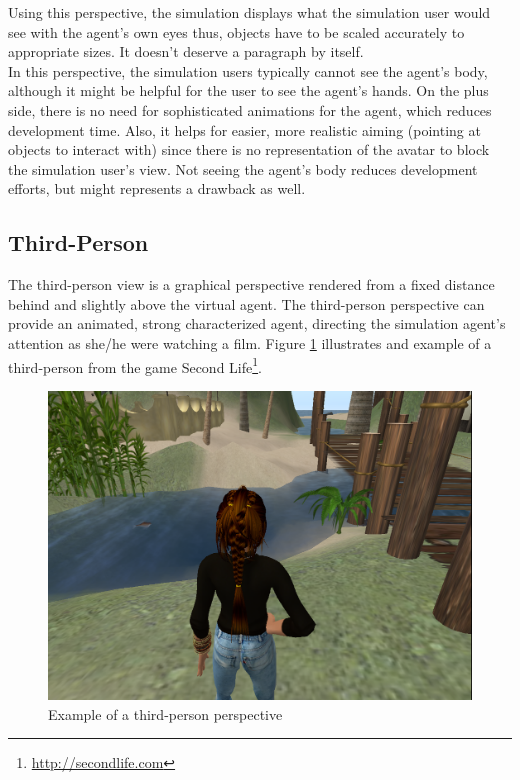 Using this perspective, the simulation displays what the simulation user would see with the agent's own eyes thus, objects have to be scaled accurately to appropriate sizes. It doesn't deserve a paragraph by itself.\\

In this perspective, the simulation users typically cannot see the agent's body, although it might be helpful for the user to see the agent's hands. On the plus side, there is no need for sophisticated animations for the agent, which reduces development time. Also, it helps for easier, more realistic aiming (pointing at objects to interact with) since there is no representation of the avatar to block the simulation user's view. Not seeing the agent's body reduces development efforts, but might represents a drawback as well.\\

\subsection{Third-Person}\label{subsec:third_person}
The third-person view is a graphical perspective rendered from a fixed distance behind and slightly above the virtual agent. The third-person perspective can provide an animated, strong characterized agent, directing the simulation agent's attention as she/he were watching a film. Figure \ref{fig:req_third_person} illustrates and example of a third-person from the game Second Life\footnote{\url{http://secondlife.com}}.
\begin{figure}[H]
	\centering
	\includegraphics[width=\linewidth]{gfx/Chapter3/third_person}
	\caption{Example of a third-person perspective}
	\label{fig:req_third_person}
\end{figure}


